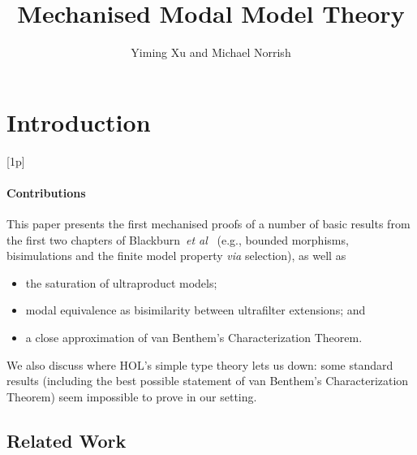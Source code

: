 \documentclass{llncs}
\begin{document}
\title{Mechanised Modal Model Theory}

\author{Yiming Xu and Michael Norrish}


\maketitle

\section{Introduction}[1p]


\paragraph{Contributions}
This paper presents the first mechanised proofs of a number of basic results from the first two chapters of Blackburn~\emph{et al}~\cite{Blackburn} (e.g., bounded morphisms, bisimulations and the finite model property \emph{via} selection), as well as
\begin{itemize}
\item the saturation of ultraproduct models;
\item modal equivalence as bisimilarity between ultrafilter extensions; and
\item a close approximation of van Benthem's Characterization Theorem.
\end{itemize}
We also discuss where HOL's simple type theory lets us down: some standard results (including the best possible statement of van Benthem's Characterization Theorem) seem impossible to prove in our setting.

\subsection{Related Work}
\end{document}
